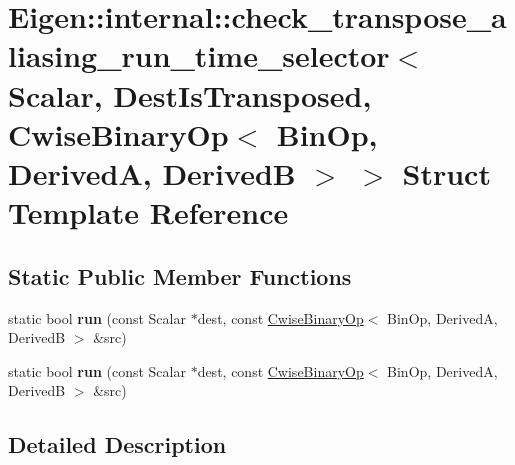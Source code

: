 \hypertarget{struct_eigen_1_1internal_1_1check__transpose__aliasing__run__time__selector_3_01_scalar_00_01_de23c75dd073d34cd03e0a4d86706317fc}{}\section{Eigen\+:\+:internal\+:\+:check\+\_\+transpose\+\_\+aliasing\+\_\+run\+\_\+time\+\_\+selector$<$ Scalar, Dest\+Is\+Transposed, Cwise\+Binary\+Op$<$ Bin\+Op, DerivedA, DerivedB $>$ $>$ Struct Template Reference}
\label{struct_eigen_1_1internal_1_1check__transpose__aliasing__run__time__selector_3_01_scalar_00_01_de23c75dd073d34cd03e0a4d86706317fc}
\subsection*{Static Public Member Functions}
\begin{DoxyCompactItemize}
\item 
\mbox{\label{struct_eigen_1_1internal_1_1check__transpose__aliasing__run__time__selector_3_01_scalar_00_01_de23c75dd073d34cd03e0a4d86706317fc_ae6e2eebec28efcb71ed43e9c1fe1d49c}} 
static bool {\bfseries run} (const Scalar $\ast$dest, const \hyperlink{group___core___module_class_eigen_1_1_cwise_binary_op}{Cwise\+Binary\+Op}$<$ Bin\+Op, DerivedA, DerivedB $>$ \&src)
\item 
\mbox{\label{struct_eigen_1_1internal_1_1check__transpose__aliasing__run__time__selector_3_01_scalar_00_01_de23c75dd073d34cd03e0a4d86706317fc_ae6e2eebec28efcb71ed43e9c1fe1d49c}} 
static bool {\bfseries run} (const Scalar $\ast$dest, const \hyperlink{group___core___module_class_eigen_1_1_cwise_binary_op}{Cwise\+Binary\+Op}$<$ Bin\+Op, DerivedA, DerivedB $>$ \&src)
\end{DoxyCompactItemize}


\subsection{Detailed Description}
